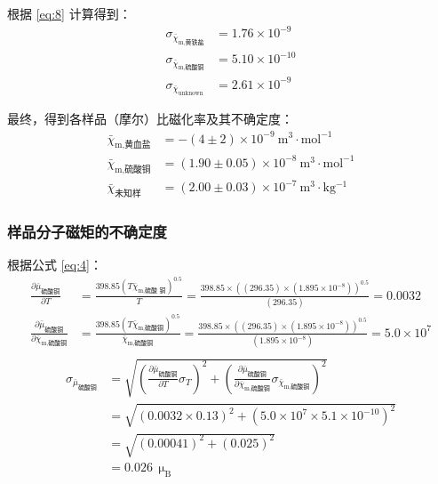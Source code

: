 \documentclass[cn,hazy,pku,12pt,normal,math=newtx,cite=super]{elegantnote}
\begin{document}
根据 \ref{eq:8} 计算得到：
\begin{align*}
    \sigma_{\bar{\chi}_{\text{m,黄铁盐}}} &= 1.76 \times 10^{-9} \\
    \sigma_{\bar{\chi}_{\text{m,硫酸铜}}} &= 5.10 \times 10^{-10} \\
    \sigma_{\bar{\chi}_{\text{unknown}}} &= 2.61 \times 10^{-9}
\end{align*}

最终，得到各样品（摩尔）比磁化率及其不确定度：
\begin{align*}
    \bar{\chi}_{\text{m,黄血盐}} &= -(4 \pm 2)\times 10^{-9} \mathrm{~m^3\cdot mol^{-1}}\\
    \bar{\chi}_{\text{m,硫酸铜}} &= (1.90 \pm 0.05)\times 10^{-8} \mathrm{~m^3\cdot mol^{-1}}\\
    \bar{\chi}_{\text{未知样}} &= (2.00\pm 0.03)\times 10^{-7} \mathrm{~m^3\cdot kg^{-1}}
\end{align*}

\subsubsection{样品分子磁矩的不确定度}

根据公式 \eqref{eq:4}：
\begin{equation*}
\begin{aligned}
\frac{\partial \bar{\mu}_{\text{硫酸铜}} }{\partial T }&=\frac{398.85 \left(T \bar{\chi}_{\text{m,硫酸
铜}}\right)^{0.5}}{T}=\frac{398.85 \times \left(\left(296.35\right) \times \left(1.895 \times 10^{-8}\right)\right)^{0.5}}{\left(296.35\right)}=0.0032\\
\frac{\partial \bar{\mu}_{\text{硫酸铜}} }{\partial \bar{\chi}_{\text{m,硫酸铜}} }&=\frac{398.85 \left(T \bar{\chi}_{\text{m,硫酸铜}}\right)^{0.5}}{\bar{\chi}_{\text{m,硫酸铜}}}=\frac{398.85 \times \left(\left(296.35\right) \times \left(1.895 \times 10^{-8}\right)\right)^{0.5}}{\left(1.895 \times 10^{-8}\right)}=5.0 \times 10^{7}\\
\end{aligned}
\end{equation*}
\begin{equation*}
\begin{aligned}
\sigma_{\bar{\mu}_{\text{硫酸铜}}}&=\sqrt{\left(\frac{\partial \bar{\mu}_{\text{硫酸铜}} }{\partial T } \sigma_{T}\right)^2+\left(\frac{\partial \bar{\mu}_{\text{硫酸铜}} }{\partial \bar{\chi}_{\text{m,硫酸铜}} } \sigma_{\bar{\chi}_{\text{m,硫酸铜}}}\right)^2}\\
&=\sqrt{\left(0.0032 \times 0.13\right)^2+\left(5.0 \times 10^{7} \times 5.1 \times 10^{-10}\right)^2}\\
&=\sqrt{\left(0.00041\right)^2+\left(0.025\right)^2}\\
&=0.026\ \mathrm{~\mu_{B}}
\end{aligned}
\end{equation*}
\end{document}
